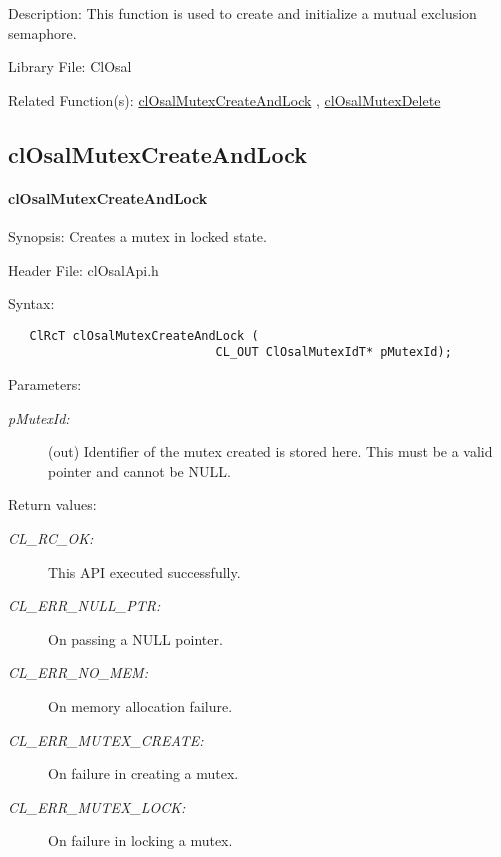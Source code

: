 \begin{Desc}
\item[Description:]This function is used to create and initialize a mutual exclusion semaphore.\end{Desc}
\begin{Desc}
\item[Library File:]Cl\-Osal\end{Desc}
\begin{Desc}
\item[Related Function(s):]\hyperlink{pageosal112}{cl\-Osal\-Mutex\-Create\-And\-Lock} , \hyperlink{pageosal115}{cl\-Osal\-Mutex\-Delete} \end{Desc}

\newpage
\subsection{clOsalMutexCreateAndLock}
\hypertarget{pageosal112}{}\paragraph{cl\-Osal\-Mutex\-Create\-And\-Lock}\label{pageosal112}
\begin{Desc}
\item[Synopsis:]Creates a mutex in locked state.\end{Desc}
\begin{Desc}
\item[Header File:]clOsalApi.h\end{Desc}
\begin{Desc}
\item[Syntax:]

\footnotesize\begin{verbatim}   ClRcT clOsalMutexCreateAndLock (
                             CL_OUT ClOsalMutexIdT* pMutexId);
\end{verbatim}
\normalsize
\end{Desc}
\begin{Desc}
\item[Parameters:]
\begin{description}
\item[{\em p\-Mutex\-Id:}](out) Identifier of the mutex created is stored here. This must be a valid pointer and cannot be NULL.\end{description}
\end{Desc}
\begin{Desc}
\item[Return values:]
\begin{description}
\item[{\em CL\_\-RC\_\-OK:}]This API executed successfully. \item[{\em CL\_\-ERR\_\-NULL\_\-PTR:}]On passing a NULL pointer. \item[{\em CL\_\-ERR\_\-NO\_\-MEM:}]On memory allocation failure. \item[{\em CL\_\-ERR\_\-MUTEX\_\-CREATE:}]On failure in creating a mutex. \item[{\em CL\_\-ERR\_\-MUTEX\_\-LOCK:}]On failure in locking a mutex.\end{description}
\end{Desc}
